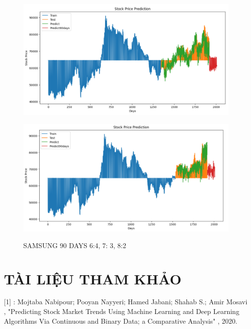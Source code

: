 \documentclass{article}
\begin{document}
\begin{multicols}{2}
\begin{figure}[H]
\begin{minipage}{0.15\textwidth}
    \label{fig:1}
    \end{minipage}%
    \begin{minipage}{0.15\textwidth}
    \centering
    \includegraphics[width=1\textwidth]{Image/N_Beat/N_BEAT_7_3_SAMSUNG_90DAYS.png}
  
    \label{fig:2}
    \end{minipage}%
    \begin{minipage}{0.15\textwidth}
    \centering
    \includegraphics[width=1\textwidth]{Image/N_Beat/N_BEAT_8_2_SAMSUNG_90DAYS.png}

    \label{fig:3}
    \end{minipage}
    \caption{SAMSUNG 90 DAYS  6:4, 7: 3, 8:2 }
\end{figure}


\section{TÀI LIỆU THAM KHẢO}


[1] : Mojtaba Nabipour; Pooyan Nayyeri; Hamed Jabani; Shahab S.; Amir Mosavi , "Predicting Stock Market Trends Using Machine Learning and Deep Learning Algorithms Via Continuous and Binary Data; a Comparative Analysis" , 2020. 


\end{multicols}
\end{document}
